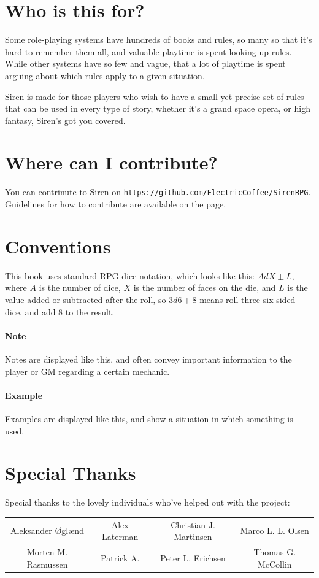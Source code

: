 \documentclass[a4paper]{book}
\begin{document}
\section*{Who is this for?}
Some role-playing systems have hundreds of books and rules, so many so that it's hard to remember them all, and valuable playtime is spent looking up rules. 
While other systems have so few and vague, that a lot of playtime is spent arguing about which rules apply to a given situation.

Siren is made for those players who wish to have a small yet precise set of rules that can be used in every type of story, whether it's a grand space opera, or high fantasy, Siren's got you covered.

\section*{Where can I contribute?}
You can contrinute to Siren on \texttt{https://github.com/ElectricCoffee/SirenRPG}.
Guidelines for how to contribute are available on the page.

\section*{Conventions}
This book uses standard RPG dice notation, which looks like this: $AdX\pm L$, where $A$ is the number of dice, $X$ is the number of faces on the die, and $L$ is the value added or subtracted after the roll, so $3d6+8$ means roll three six-sided dice, and add 8 to the result.
\paragraph{Note} Notes are displayed like this, and often convey important information to the player or GM regarding a certain mechanic.
\paragraph{Example} Examples are displayed like this, and show a situation in which something is used.

\newpage
\section*{Special Thanks}
Special thanks to the lovely individuals who've helped out with the project:
\begin{center}
    \begin{tabular}{cccc}
        Aleksander Øglænd & Alex Laterman & Christian J. Martinsen & Marco L. L. Olsen \\ 
        Morten M. Rasmussen & Patrick A. & Peter L. Erichsen & Thomas G. McCollin \\
    \end{tabular}
\end{center}
\end{document}
